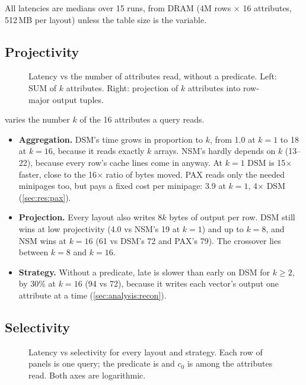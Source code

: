 All latencies are medians over 15 runs, from DRAM (4M rows $\times$ 16 attributes, 512\,MB per
layout) unless the table size is the variable.

\subsection{Projectivity}
\label{sec:res:proj}

\begin{figure}[t]
\centering
{}
\caption{Latency vs the number of attributes read, without a predicate. Left: SUM of $k$
attributes. Right: projection of $k$ attributes into row-major output tuples.}
\label{fig:projectivity}
\end{figure}

 varies the number $k$ of the 16 attributes a query reads.
\begin{itemize}
\item \textbf{Aggregation.} DSM's time grows in proportion to $k$, from 1.0\ms{} at $k{=}1$ to
18\ms{} at $k{=}16$, because it reads exactly $k$ arrays. NSM's hardly depends on $k$
(13--22\ms), because every row's cache lines come in anyway. At $k{=}1$ DSM is 15$\times$
faster, close to the 16$\times$ ratio of bytes moved. PAX reads only the needed minipages too,
but pays a fixed cost per minipage: 3.9\ms{} at $k{=}1$, 4$\times$ DSM (\cref{sec:res:pax}).
\item \textbf{Projection.} Every layout also writes $8k$ bytes of output per row. DSM still wins
at low projectivity (4.0\ms{} vs NSM's 19\ms{} at $k{=}1$) and up to $k{=}8$, and NSM wins at
$k{=}16$ (61\ms{} vs DSM's 72\ms{} and PAX's 79\ms). The crossover lies between $k{=}8$ and
$k{=}16$.
\item \textbf{Strategy.} Without a predicate, late is slower than early on DSM for $k \ge 2$,
by 30\% at $k{=}16$ (94 vs 72\ms), because it writes each vector's output one attribute at a
time (\cref{sec:analysis:recon}).
\end{itemize}

\subsection{Selectivity}
\label{sec:res:sel}

\begin{figure}[p]
\centering
{}
\caption{Latency vs selectivity for every layout and strategy. Each row of panels is one
query; the predicate is  and $c_0$ is among the attributes read. Both axes are
logarithmic.}
\label{fig:selectivity}
\end{figure}

